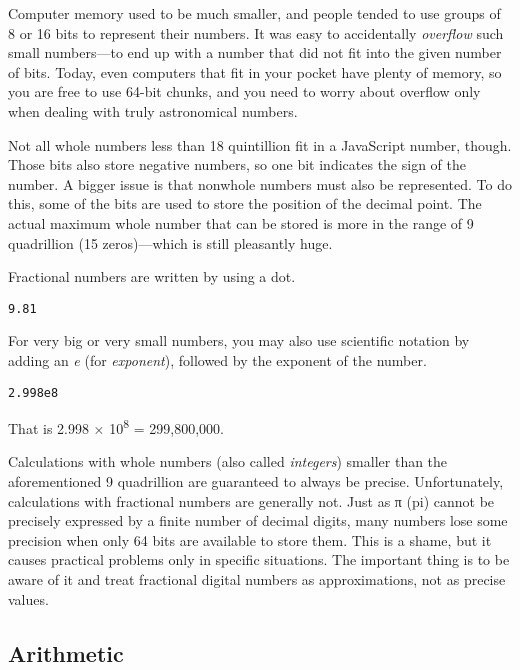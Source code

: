 Computer memory used to be much smaller, and people tended to use groups of 8 or 16 bits to represent their numbers. It was easy to accidentally \emph{overflow} such small numbers—to end up with a number that did not fit into the given number of bits. Today, even computers that fit in your pocket have plenty of memory, so you are free to use 64-bit chunks, and you need to worry about overflow only when dealing with truly astronomical numbers.

Not all whole numbers less than 18 quintillion fit in a JavaScript number, though. Those bits also store negative numbers, so one bit indicates the sign of the number. A bigger issue is that nonwhole numbers must also be represented. To do this, some of the bits are used to store the position of the decimal point. The actual maximum whole number that can be stored is more in the range of 9 quadrillion (15 zeros)—which is still pleasantly huge.

Fractional numbers are written by using a dot.

\begin{lstlisting}
9.81
\end{lstlisting}
\noindent{}

For very big or very small numbers, you may also use scientific notation by adding an \emph{e} (for \emph{exponent}), followed by the exponent of the number.

\begin{lstlisting}
2.998e8
\end{lstlisting}
\noindent

That is 2.998 × 10\textsuperscript{8} = 299,800,000.

Calculations with whole numbers (also called \emph{integers}) smaller than the aforementioned 9 quadrillion are guaranteed to always be precise. Unfortunately, calculations with fractional numbers are generally not. Just as π (pi) cannot be precisely expressed by a finite number of decimal digits, many numbers lose some precision when only 64 bits are available to store them. This is a shame, but it causes practical problems only in specific situations. The important thing is to be aware of it and treat fractional digital numbers as approximations, not as precise values.

\subsection{Arithmetic}

